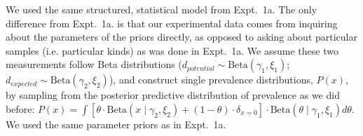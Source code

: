 \documentclass[12pt,letterpaper]{article}
\newcommand{\ndg}[1]{\textcolor{Green}{[ndg: #1]}}
\begin{document}
We used the same structured, statistical model from Expt.~1a.
The only difference from Expt.~1a. is that our experimental data comes from inquiring about the parameters of the priors directly, as opposed to asking about particular samples (i.e. particular kinds) as was done in Expt.~1a. 
We assume these two measurements follow Beta distributions ($d_{potential} \sim \text{Beta}(\gamma_{1}, \xi_{1})$; $
d_{expected} \sim \text{Beta}(\gamma_{2}, \xi_{2})$), and construct single prevalence distributions, $P(x)$, by sampling from the posterior predictive distribution of prevalence as we did before: $P(x) = \int [ \theta\cdot \text{Beta} (x \mid \gamma_{2}, \xi_{2}) + (1 -  \theta) \cdot \delta_{x=0} ] \cdot \text{Beta}(\theta \mid \gamma_{1}, \xi_{1}) d\theta$.
We used the same parameter priors as in Expt.~1a.
%
%
\end{document}
